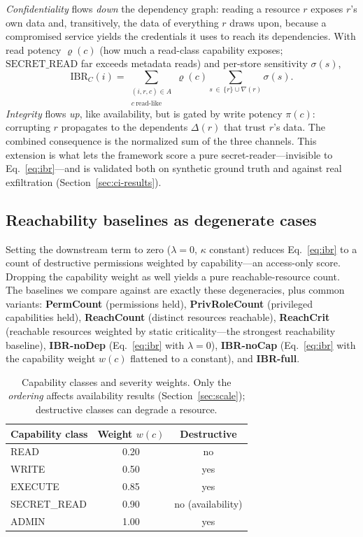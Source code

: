 \documentclass[conference]{IEEEtran}
\begin{document}
\emph{Confidentiality} flows \emph{down} the dependency graph: reading a resource
$r$ exposes $r$'s own data and, transitively, the data of everything $r$ draws
upon, because a compromised service yields the credentials it uses to reach its
dependencies. With read potency $\varrho(c)$ (how much a read-class capability
exposes; $\mathrm{SECRET\_READ}$ far exceeds metadata reads) and per-store
sensitivity $\sigma(s)$,
\begin{equation}
\mathrm{IBR}_C(i) = \!\!\!\sum_{\substack{(i,r,c)\in A\\ c\ \text{read-like}}}\!\!\!
 \varrho(c)\!\!\sum_{s\,\in\,\{r\}\cup\nabla(r)}\!\!\!\sigma(s).
\label{eq:conf}
\end{equation}
\emph{Integrity} flows \emph{up}, like availability, but is gated by write potency
$\pi(c)$: corrupting $r$ propagates to the dependents $\Delta(r)$ that trust $r$'s
data. The combined consequence is the normalized sum of the three channels. This
extension is what lets the framework score a pure secret-reader---invisible to
Eq.~\eqref{eq:ibr}---and is validated both on synthetic ground truth and against
real exfiltration (Section~\ref{sec:ci-results}).

\subsection{Reachability baselines as degenerate cases}
Setting the downstream term to zero ($\lambda=0$, $\kappa$ constant) reduces
Eq.~\eqref{eq:ibr} to a count of destructive permissions weighted by
capability---an access-only score. Dropping the capability weight as well yields a
pure reachable-resource count. The baselines we compare against are exactly these
degeneracies, plus common variants: \textbf{PermCount} (permissions held),
\textbf{PrivRoleCount} (privileged capabilities held), \textbf{ReachCount} (distinct
resources reachable), \textbf{ReachCrit} (reachable resources weighted by static
criticality---the strongest reachability baseline), \textbf{IBR-noDep}
(Eq.~\eqref{eq:ibr} with $\lambda=0$), \textbf{IBR-noCap} (Eq.~\eqref{eq:ibr} with the
capability weight $w(c)$ flattened to a constant), and \textbf{IBR-full}.

\begin{table}[t]
\caption{Capability classes and severity weights. Only the \emph{ordering} affects
availability results (Section~\ref{sec:scale}); destructive classes can degrade a
resource.}
\label{tab:caps}
\centering
\begin{tabular}{lcc}
\toprule
Capability class & Weight $w(c)$ & Destructive \\
\midrule
READ & 0.20 & no \\
WRITE & 0.50 & yes \\
EXECUTE & 0.85 & yes \\
SECRET\_READ & 0.90 & no (availability) \\
ADMIN & 1.00 & yes \\
\bottomrule
\end{tabular}
\end{table}
\end{document}
